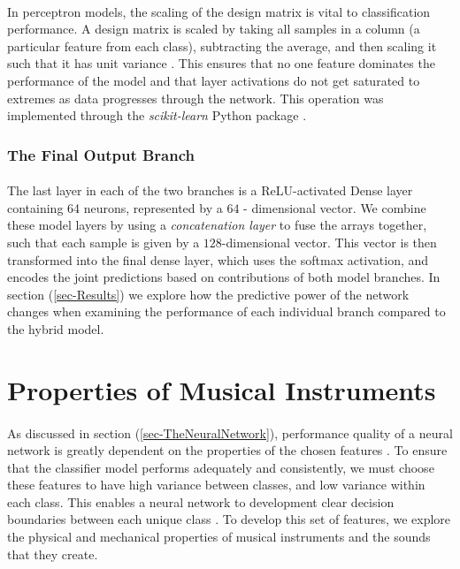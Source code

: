\documentclass[12pt,letterpaper]{article}
\begin{document}
\paragraph*{}In perceptron models, the scaling of the design matrix is vital to classification performance. A design matrix is scaled by taking all samples in a column (a particular feature from each class), subtracting the average, and then scaling it such that it has unit variance \cite{Geron,James}. This ensures that no one feature dominates the performance of the model and that layer activations do not get saturated to extremes as data progresses through the network. This operation was implemented through the \textit{scikit-learn} Python package \cite{Sklearn}.


\subsubsection{The Final Output Branch}

\paragraph*{}The last layer in each of the two branches is a ReLU-activated Dense layer containing 64 neurons, represented by a $64$ - dimensional vector. We combine these model layers by using a \textit{concatenation layer} to fuse the arrays together, such that each sample is given by a $128$-dimensional vector. This vector is then transformed into the final dense layer, which uses the softmax activation, and encodes the joint predictions based on contributions of both model branches. In section (\ref{sec-Results}) we explore how the predictive power of the network changes when examining the performance of each individual branch compared to the hybrid model.


\newpage
\section{Properties of Musical Instruments}
\label{sec-Instruments}

\paragraph*{}As discussed in section (\ref{sec-TheNeuralNetwork}), performance quality of a neural network is greatly dependent on the properties of the chosen features \cite{Virtanen,Liu}. To ensure that the classifier model performs adequately and consistently, we must choose these features to have high variance between classes, and low variance within each class. This enables a neural network to development clear decision boundaries between each unique class \cite{James,Serizel}. To develop this set of features, we explore the physical and mechanical properties of musical instruments and the sounds that they create.
\end{document}
